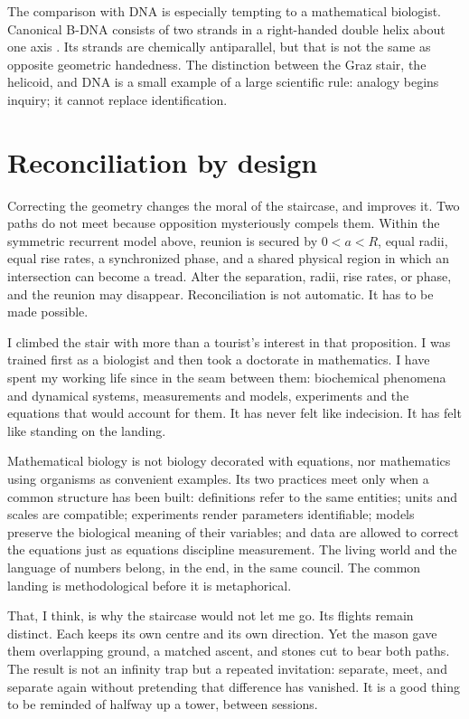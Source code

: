 \documentclass[pdflatex,sn-mathphys-num]{sn-jnl}
\begin{document}
The comparison with DNA is especially tempting to a mathematical biologist.
Canonical B-DNA consists of two strands in a right-handed double helix about one
axis \citep{WatsonCrick1953}. Its strands are chemically antiparallel, but that
is not the same as opposite geometric handedness. The distinction between the
Graz stair, the helicoid, and DNA is a small example of a large scientific rule:
analogy begins inquiry; it cannot replace identification.

\section{Reconciliation by design}
Correcting the geometry changes the moral of the staircase, and improves it.
Two paths do not meet because opposition mysteriously compels them. Within the
symmetric recurrent model above, reunion is secured by $0<a<R$, equal radii,
equal rise rates, a synchronized phase, and a shared physical region in which
an intersection can become a tread. Alter the separation, radii, rise rates, or
phase, and the reunion may disappear. Reconciliation is not automatic. It has
to be made possible.

I climbed the stair with more than a tourist's interest in that proposition. I
was trained first as a biologist and then took a doctorate in mathematics. I
have spent my working life since in the seam between them: biochemical
phenomena and dynamical systems, measurements and models, experiments and the
equations that would account for them. It has never felt like indecision. It has
felt like standing on the landing.

Mathematical biology is not biology decorated with equations, nor mathematics
using organisms as convenient examples. Its two practices meet only when a
common structure has been built: definitions refer to the same entities; units
and scales are compatible; experiments render parameters identifiable; models
preserve the biological meaning of their variables; and data are allowed to
correct the equations just as equations discipline measurement. The living 
world and the language of numbers belong, in the end, in the same council.
The common landing is methodological before it is metaphorical.

That, I think, is why the staircase would not let me go. Its flights remain
distinct. Each keeps its own centre and its own direction. Yet the mason gave
them overlapping ground, a matched ascent, and stones cut to bear both paths.
The result is not an infinity trap but a repeated invitation: separate, meet,
and separate again without pretending that difference has vanished. It is a
good thing to be reminded of halfway up a tower, between sessions.
\end{document}
